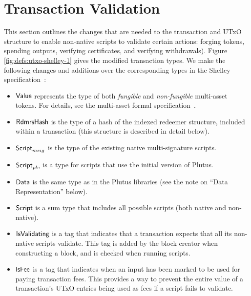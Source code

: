 \section{Transaction Validation}
\label{sec:transactions}

This section outlines the changes that are needed to the transaction and
UTxO structure to enable non-native scripts to validate
certain actions: forging tokens, spending outputs, verifying certificates, and
verifying withdrawals).
%
Figure \ref{fig:defs:utxo-shelley-1} gives the modified transaction types.
We make the following changes and additions over the corresponding types in the
Shelley specification~\cite{XX}:

\begin{itemize}
  \item $\mathsf{Value}$ represents the type of
  both \emph{fungible} and \emph{non-fungible} multi-asset tokens. For details, see the multi-asset formal specification~\cite{XX}.

  \item $\mathsf{RdmrsHash}$ is the type of a hash of the indexed redeemer structure,
  included within a transaction (this structure is described in detail below).

  \item $\mathsf{Script}_{msig}$ is the type of the existing native multi-signature scripts.

  \item $\mathsf{Script}_{plc}$ is a type for scripts that use the initial version of Plutus.

  \item $\mathsf{Data}$ is the same type as in the Plutus libraries (see the note on ``Data Representation'' below).

  \item $\mathsf{Script}$ is a sum type that includes all possible scripts (both native and non-native).

  \item $\mathsf{IsValidating}$ is a tag that indicates that a transaction
  expects that all its non-native scripts validate.
  This tag is added by the block creator when
  constructing a block, and is checked when running scripts.

  \item $\mathsf{IsFee}$ is a tag that indicates when an input has been marked
    to be used for paying transaction fees.
    This provides a way to prevent
  the entire value of a transaction's UTxO entries being used as fees if a script fails to validate.


\end{itemize}
